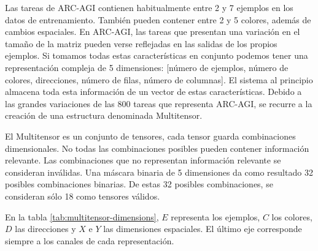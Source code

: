 \documentclass[11pt,a4paper,spanish]{book}
\numberwithin{equation}{chapter}
\numberwithin{figure}{chapter}
\begin{document}
Las tareas de ARC-AGI contienen habitualmente entre 2 y 7 ejemplos en los datos de entrenamiento. También pueden contener entre 2 y 5 colores,
además de cambios espaciales. En ARC-AGI, las tareas que presentan una variación en el tamaño de la matriz pueden verse reflejadas
en las salidas de los propios ejemplos. Si tomamos todas estas características en conjunto podemos tener una representación compleja
de 5 dimensiones: [número de ejemplos, número de colores, direcciones, número de filas, número de columnas]. El sistema al principio
almacena toda esta información de un vector de estas características. Debido a las grandes variaciones de las 800 tareas que
representa ARC-AGI, se recurre a la creación de una estructura denominada Multitensor.

El Multitensor es un conjunto de tensores, cada tensor guarda combinaciones dimensionales. No todas las combinaciones posibles pueden contener
información relevante. Las combinaciones que no representan información relevante se consideran inválidas. Una máscara binaria de
5 dimensiones da como resultado 32 posibles combinaciones binarias. De estas 32 posibles combinaciones, se consideran
sólo 18 como tensores válidos.

En la tabla \ref{tab:multitensor-dimensions}, $E$ representa los ejemplos, $C$ los colores, $D$ las direcciones y
$X$ e $Y$ las dimensiones espaciales. El último eje corresponde siempre a los canales de cada representación.
\end{document}
